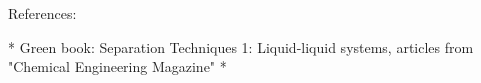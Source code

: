 References:

* Green book: Separation Techniques 1: Liquid-liquid systems, articles from "Chemical Engineering Magazine"
*